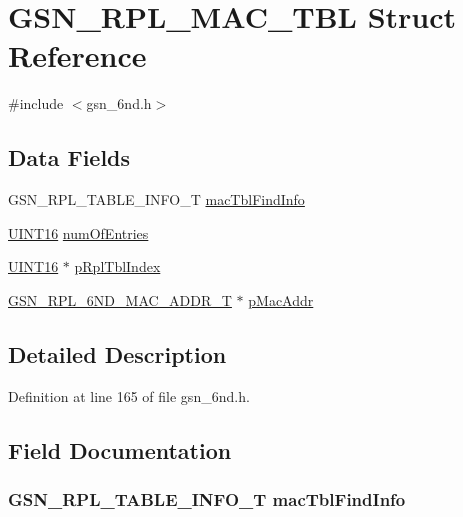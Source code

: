 \hypertarget{a00204}{
\section{GSN\_\-RPL\_\-MAC\_\-TBL Struct Reference}
\label{a00204}
}


{\ttfamily \#include $<$gsn\_\-6nd.h$>$}

\subsection*{Data Fields}
\begin{DoxyCompactItemize}
\item 
GSN\_\-RPL\_\-TABLE\_\-INFO\_\-T \hyperlink{a00204_a42618eedd7ca37d6eff7525295e5df36}{macTblFindInfo}
\item 
\hyperlink{a00660_ga09f1a1fb2293e33483cc8d44aefb1eb1}{UINT16} \hyperlink{a00204_a78205f26db26ba32892f92e1f48491c4}{numOfEntries}
\item 
\hyperlink{a00660_ga09f1a1fb2293e33483cc8d44aefb1eb1}{UINT16} $\ast$ \hyperlink{a00204_a73a7256d53a8c7853f424ec33cc0cf0c}{pRplTblIndex}
\item 
\hyperlink{a00196}{GSN\_\-RPL\_\-6ND\_\-MAC\_\-ADDR\_\-T} $\ast$ \hyperlink{a00204_a46a19f50aa31b0b18f53077d64e90439}{pMacAddr}
\end{DoxyCompactItemize}


\subsection{Detailed Description}


Definition at line 165 of file gsn\_\-6nd.h.



\subsection{Field Documentation}
\hypertarget{a00204_a42618eedd7ca37d6eff7525295e5df36}{
\subsubsection[{macTblFindInfo}]{\setlength{\rightskip}{0pt plus 5cm}GSN\_\-RPL\_\-TABLE\_\-INFO\_\-T {\bf macTblFindInfo}}}
\label{a00204_a42618eedd7ca37d6eff7525295e5df36}



